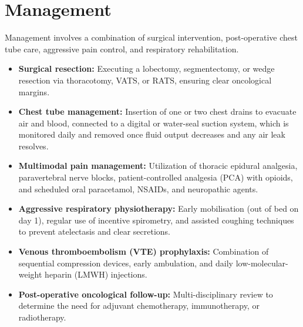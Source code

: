 \section*{Management}
Management involves a combination of surgical intervention, post-operative chest tube care, aggressive pain control, and respiratory rehabilitation.
\begin{itemize}
    \item \textbf{Surgical resection:} Executing a lobectomy, segmentectomy, or wedge resection via thoracotomy, VATS, or RATS, ensuring clear oncological margins.
    \item \textbf{Chest tube management:} Insertion of one or two chest drains to evacuate air and blood, connected to a digital or water-seal suction system, which is monitored daily and removed once fluid output decreases and any air leak resolves.
    \item \textbf{Multimodal pain management:} Utilization of thoracic epidural analgesia, paravertebral nerve blocks, patient-controlled analgesia (PCA) with opioids, and scheduled oral paracetamol, NSAIDs, and neuropathic agents.
    \item \textbf{Aggressive respiratory physiotherapy:} Early mobilisation (out of bed on day 1), regular use of incentive spirometry, and assisted coughing techniques to prevent atelectasis and clear secretions.
    \item \textbf{Venous thromboembolism (VTE) prophylaxis:} Combination of sequential compression devices, early ambulation, and daily low-molecular-weight heparin (LMWH) injections.
    \item \textbf{Post-operative oncological follow-up:} Multi-disciplinary review to determine the need for adjuvant chemotherapy, immunotherapy, or radiotherapy.
\end{itemize}

